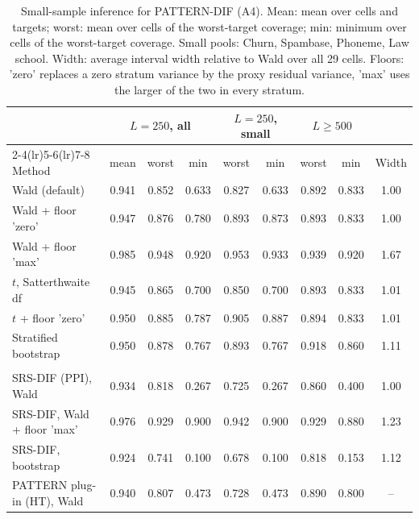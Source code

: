 \documentclass[pdflatex,sn-mathphys-num,iicol]{sn-jnl}
\theoremstyle{thmstyleone}
\theoremstyle{thmstyletwo}
\theoremstyle{thmstylethree}
\begin{document}
\begin{table}[t]
\centering\footnotesize
\setlength{\tabcolsep}{4pt}
\caption{Small-sample inference for PATTERN-DIF (A4). Mean: mean over cells and targets; worst: mean over cells of the worst-target coverage; min: minimum over cells of the worst-target coverage. Small pools: Churn, Spambase, Phoneme, Law school. Width: average interval width relative to Wald over all 29 cells. Floors: 'zero' replaces a zero stratum variance by the proxy residual variance, 'max' uses the larger of the two in every stratum.}
\label{tab:abl-inference}
\begin{tabular}{lcccccccc}
\toprule
 & \multicolumn{3}{c}{$L=250$, all} & \multicolumn{2}{c}{$L=250$, small} & \multicolumn{2}{c}{$L\ge 500$} & \\
\cmidrule(lr){2-4}\cmidrule(lr){5-6}\cmidrule(lr){7-8}
Method & mean & worst & min & worst & min & worst & min & Width \\
\midrule
Wald (default) & 0.941 & 0.852 & 0.633 & 0.827 & 0.633 & 0.892 & 0.833 & 1.00 \\
Wald + floor 'zero' & 0.947 & 0.876 & 0.780 & 0.893 & 0.873 & 0.893 & 0.833 & 1.00 \\
Wald + floor 'max' & 0.985 & 0.948 & 0.920 & 0.953 & 0.933 & 0.939 & 0.920 & 1.67 \\
$t$, Satterthwaite df & 0.945 & 0.865 & 0.700 & 0.850 & 0.700 & 0.893 & 0.833 & 1.01 \\
$t$ + floor 'zero' & 0.950 & 0.885 & 0.787 & 0.905 & 0.887 & 0.894 & 0.833 & 1.01 \\
Stratified bootstrap & 0.950 & 0.878 & 0.767 & 0.893 & 0.767 & 0.918 & 0.860 & 1.11 \\
\addlinespace
\multicolumn{9}{l}{\emph{References}} \\
SRS-DIF (PPI), Wald & 0.934 & 0.818 & 0.267 & 0.725 & 0.267 & 0.860 & 0.400 & 1.00 \\
SRS-DIF, Wald + floor 'max' & 0.976 & 0.929 & 0.900 & 0.942 & 0.900 & 0.929 & 0.880 & 1.23 \\
SRS-DIF, bootstrap & 0.924 & 0.741 & 0.100 & 0.678 & 0.100 & 0.818 & 0.153 & 1.12 \\
PATTERN plug-in (HT), Wald & 0.940 & 0.807 & 0.473 & 0.728 & 0.473 & 0.890 & 0.800 & -- \\
\bottomrule
\end{tabular}

\end{table}
\end{document}

